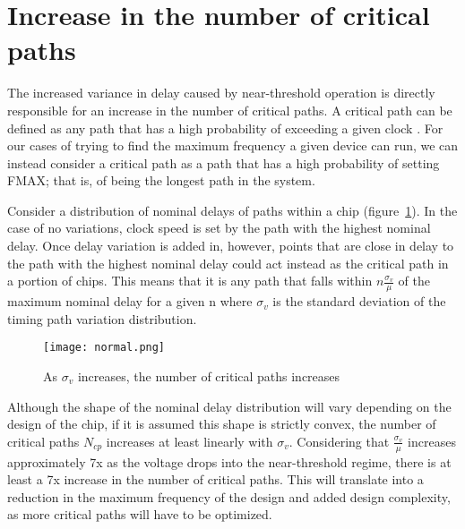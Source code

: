 \section{Increase in the number of critical paths}
The increased variance in delay caused by near-threshold operation is directly responsible for an increase in the number of critical paths.
A critical path can be defined as any path that has a high probability of exceeding a given clock \cite{Wang:2004bw}.
For our cases of trying to find the maximum frequency a given device can run, we can instead consider a critical path as a path that has a high probability of setting FMAX; that is, of being the longest path in the system.
  
Consider a distribution of nominal delays of paths within a chip (figure~\ref{fig:normal}).
In the case of no variations, clock speed is set by the path with the highest nominal delay.
Once delay variation is added in, however, points that are close in delay to the path with the highest nominal delay could act instead as the critical path in a portion of chips.
This means that it is any path that falls within $n\frac{\sigma_v}{\mu}$ of the maximum nominal delay for a given n where $\sigma_v$ is the standard deviation of the timing path variation distribution.
 
\begin{figure}[thpb]
    \centering
    \texttt{[image: normal.png]}
    \caption{As $\sigma_v$ increases, the number of critical paths increases}
    \label{fig:normal}
\end{figure}
 
 Although the shape of the nominal delay distribution will vary depending on the design of the chip, if it is assumed this shape is strictly convex, the number of critical paths $N_{cp}$ increases at least linearly with $\sigma_v$.
Considering that $\frac{\sigma_v}{\mu}$ increases approximately 7x as the voltage drops into the near-threshold regime, there is at least a 7x increase in the number of critical paths.
This will translate into a reduction in the maximum frequency of the design\cite{Bowman:2002cp} and added design complexity, as more critical paths will have to be optimized.

